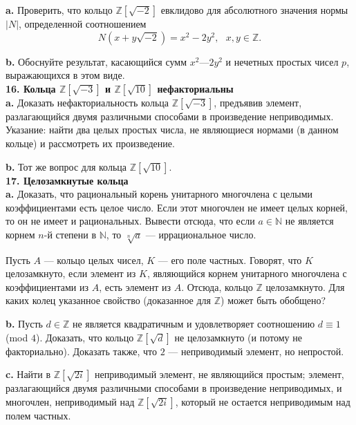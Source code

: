 \textbf{a.} Проверить, что кольцо $\mathbb{Z}[\sqrt{-2}]$ евклидово для абсолютного значения нормы $|N|$, определенной соотношением
\[
N(x+y\sqrt{-2})=x^2-2 y^2, \text{ } x,y \in \mathbb{Z}.
\]

\textbf{b.} Обоснуйте результат, касающийся сумм $x^2 — 2 y^2$ и нечетных
простых чисел $p$, выражающихся в этом виде.
\\

\noindent \textbf{16. Кольца $\mathbb{Z}[\sqrt{-3}]$ и $\mathbb{Z}[\sqrt{10}]$ нефакториальны}
\\

\textbf{a.} Доказать нефакториальность кольца $\mathbb{Z}[\sqrt{-3}]$, предъявив элемент, разлагающийся двумя различными способами в произведение 
неприводимых. Указание: найти два целых простых числа, не являющиеся
нормами (в данном кольце) и рассмотреть их произведение.

\textbf{b.} Тот же вопрос для кольца $\mathbb{Z}[\sqrt{10}]$.
\\

\noindent \textbf{17. Целозамкнутые кольца}
\\

\textbf{a.} Доказать, что рациональный корень унитарного многочлена с
целыми коэффициентами есть целое число. Если этот многочлен не
имеет целых корней, то он не имеет и рациональных. Вывести отсюда,
что если $a \in \mathbb{N}$ не является корнем $n$-й степени в $\mathbb{N}$, то $\sqrt[n]{a}$ — иррациональное число.

Пусть $A$ — кольцо целых чисел, $K$ — его поле частных. Говорят, что
$K$ целозамкнуто, если элемент из $K$, являющийся корнем унитарного
многочлена с коэффициентами из $A$, есть элемент из $A$. Отсюда, 
кольцо $\mathbb{Z}$ целозамкнуто. Для каких колец указанное свойство (доказанное для $\mathbb{Z}$) может быть обобщено?

\textbf{b.} Пусть $d \in \mathbb{Z}$ не является квадратичным и удовлетворяет 
соотношению $d \equiv 1$ (mod $4$). Доказать, что кольцо $\mathbb{Z}[\sqrt{d}]$ не целозамкнуто (и потому не факториально). Доказать также, что $2$ — неприводимый элемент, но непростой.

\pagebreak

\textbf{c.} Найти в $\mathbb{Z}[\sqrt{2i}]$ неприводимый элемент, не являющийся простым; элемент, разлагающийся двумя различными способами в произведение неприводимых, и многочлен, неприводимый над $\mathbb{Z}[\sqrt{2i}]$, который не остается неприводимым над полем частных.
\\

